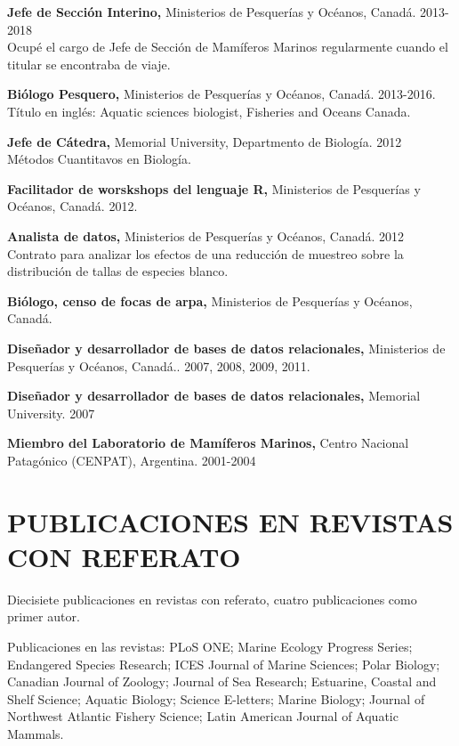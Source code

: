 \documentclass{res}
\begin{document}
\begin{resume}
\textbf{Jefe de Secci\'on Interino,} Ministerios de Pesquer\'ias y Oc\'eanos, Canad\'a. 2013-2018\\ Ocup\'e el cargo de Jefe de Secci\'on de Mam\'iferos Marinos regularmente cuando el titular se encontraba de viaje.

\textbf{Bi\'ologo Pesquero,} Ministerios de Pesquer\'ias y Oc\'eanos, Canad\'a. 2013-2016. T\'{i}tulo en ingl\'es: Aquatic sciences biologist, Fisheries and Oceans Canada.

\textbf{Jefe de C\'atedra,} Memorial University, Departmento de Biolog\'ia. 2012 \\ M\'etodos Cuantitavos en Biolog\'ia.  

\textbf{Facilitador de worskshops del lenguaje R,} Ministerios de Pesquer\'ias y Oc\'eanos, Canad\'a. 2012.

\textbf{Analista de datos,}  Ministerios de Pesquer\'ias y Oc\'eanos, Canad\'a. 2012\\
Contrato para analizar los efectos de una reducci\'on de muestreo sobre la distribuci\'on de tallas de especies blanco.

\textbf{Bi\'ologo, censo de focas de arpa,} Ministerios de Pesquer\'ias y Oc\'eanos, Canad\'a. 

\textbf{Dise\~{n}ador y desarrollador de bases de datos relacionales,} Ministerios de Pesquer\'ias y Oc\'eanos, Canad\'a.. 2007, 2008, 2009, 2011.

\textbf{Dise\~{n}ador y desarrollador de bases de datos relacionales,} Memorial University. 2007

\textbf{Miembro del Laboratorio de Mam\'iferos Marinos,} Centro Nacional Patag\'{o}nico (CENPAT), Argentina. 2001-2004
 
 \pagebreak

\section{PUBLICACIONES EN REVISTAS CON REFERATO} 

Diecisiete publicaciones en revistas con referato, cuatro publicaciones como primer autor. 

Publicaciones en las revistas: PLoS ONE; Marine Ecology Progress Series; Endangered Species Research; ICES Journal of Marine Sciences; Polar Biology; Canadian Journal of Zoology; Journal of Sea Research; Estuarine, Coastal and Shelf Science; Aquatic Biology; Science E-letters; Marine Biology; Journal of Northwest Atlantic Fishery Science; Latin American Journal of Aquatic Mammals.
 

\end{resume}
\end{document}
